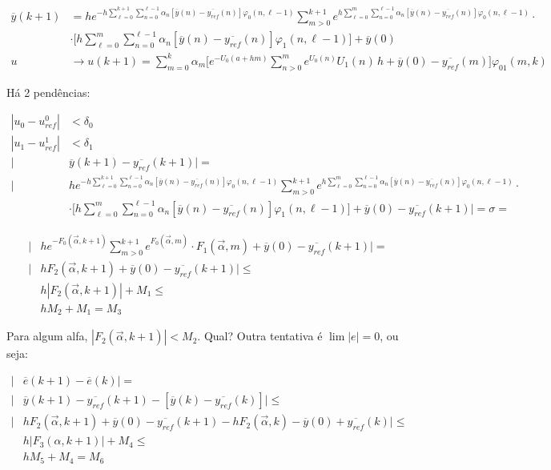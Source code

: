 \documentclass[11pt]{article}
\begin{document}
\begin{align}
\overline{y}(k+ 1) &= h e^{- h \sum_{\ell = 0}^{k+1} \sum_{n = 0}^{\ell - 1} \alpha_n [\overline{y}(n) - \overline{y_{ref}}(n)] \varphi_{0} (n, \ell-1)} \sum_{m > 0}^{k+1} e^{h \sum_{\ell = 0}^{m} \sum_{n = 0}^{\ell - 1} \alpha_n [\overline{y}(n) - \overline{y_{ref}}(n)] \varphi_{0} (n, \ell-1)} \cdot \nonumber \\
&\cdot \bigg[ h \sum_{\ell = 0}^{m} \sum_{n = 0}^{\ell - 1} \alpha_n [\overline{y}(n) - \overline{y_{ref}}(n)] \varphi_{1} (n, \ell-1) \bigg] + \overline{y}(0) \\
u &\to u(k + 1) = \sum_{m = 0}^k \alpha_m \bigg[ e^{-U_0(a + hm)} \sum_{n > 0}^m e^{U_0(n)} U_1(n)\, h + \overline{y}(0) - \overline{y_{ref}}(m) \bigg] \varphi_{01} (m, k)
\end{align}

H\'a 2 pend\^encias:

\begin{align}
|u_0 - u_{ref}^0| &< \delta_0 \\
|u_1 - u_{ref}^1| &< \delta_1 \\
  |&\overline{y}(k+1) - \overline{y_{ref}}(k+1)| = \\
\bigg| &h e^{- h \sum_{\ell = 0}^{k+1} \sum_{n = 0}^{\ell - 1} \alpha_n [\overline{y}(n) - \overline{y_{ref}}(n)] \varphi_{0} (n, \ell-1)} \sum_{m > 0}^{k+1} e^{h \sum_{\ell = 0}^{m} \sum_{n = 0}^{\ell - 1} \alpha_n [\overline{y}(n) - \overline{y_{ref}}(n)] \varphi_{0} (n, \ell-1)} \cdot \nonumber \\
&\cdot \bigg[ h \sum_{\ell = 0}^{m} \sum_{n = 0}^{\ell - 1} \alpha_n [\overline{y}(n) - \overline{y_{ref}}(n)] \varphi_{1} (n, \ell-1) \bigg] + \overline{y}(0) - \overline{y_{ref}}(k+1) \bigg| = \sigma =
\end{align}

\begin{align}
\bigg| &h e^{- F_0(\vec \alpha, k+1)} \sum_{m > 0}^{k+1} e^{F_0(\vec \alpha, m)} \cdot F_1(\vec \alpha, m) + \overline{y}(0) - \overline{y_{ref}}(k+1) \bigg| = \\
\bigg| &h F_2( \vec \alpha, k+1) + \overline{y}(0) - \overline{y_{ref}}(k+1) \bigg| \le \\
&h | F_2( \vec \alpha, k+1) | + M_1 \le \\
&hM_2 + M_1 = M_3
\end{align}

Para algum alfa, $|F_2( \vec \alpha, k+1)| < M_2$. Qual? Outra tentativa \'e $\lim |e| = 0$, ou seja:

\begin{align}
  |&\overline{e}(k+1) - \overline{e}(k)| = \\
  |&\overline{y}(k+1) - \overline{y_{ref}}(k+1) - [\overline{y}(k) - \overline{y_{ref}}(k)]| \le \\
  | &h F_2( \vec \alpha, k+1) + \overline{y}(0) - \overline{y_{ref}}(k+1) - h F_2( \vec \alpha, k) - \overline{y}(0) + \overline{y_{ref}}(k) | \le \\
  &h |F_3(\alpha, k +1)| + M_4 \le \\
  &hM_5 + M_4 = M_6
\end{align}
\end{document}
